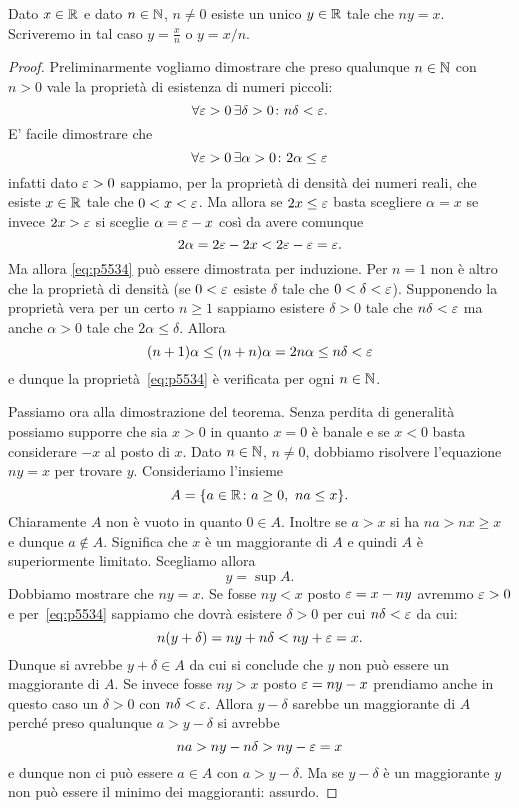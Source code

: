 \begin{theorem}
  \label{th:divisibilita}%
  Dato $x\in \mathbb R$ e dato $n\in \mathbb N$, $n\neq 0$ esiste un unico $y\in \mathbb R$ 
  tale che $n y = x$. 
  Scriveremo in tal caso $y=\frac{x}{n}$ o $y=x/n$.
\end{theorem}
\begin{proof}
  Preliminarmente vogliamo dimostrare che  
  preso qualunque $n\in \mathbb N$ con $n>0$
  vale la proprietà di esistenza di numeri piccoli:
  \begin{equation}\label{eq:p5534}
    \forall \varepsilon>0\, \exists \delta>0 \colon n\delta < \varepsilon.
  \end{equation}
  E' facile dimostrare che 
  \[
    \forall \varepsilon>0\, \exists \alpha>0 \colon 2 \alpha \le \varepsilon  
  \]
  infatti dato $\varepsilon>0$ sappiamo, per la proprietà di
  densità dei numeri reali, che esiste $x\in \mathbb R$ tale che $0<x<\varepsilon$.
  Ma allora se $2x\le \varepsilon$ basta scegliere $\alpha = x$ 
  se invece $2x>\varepsilon$ si sceglie $\alpha = \varepsilon-x$
  così da avere comunque
  \[
  2 \alpha = 2 \varepsilon - 2 x < 2\varepsilon - \varepsilon = \varepsilon.
  \]
  Ma allora \eqref{eq:p5534} può essere dimostrata per induzione.
  Per $n=1$ non è altro che la proprietà di densità (se $0<\varepsilon$ esiste $\delta$ tale 
  che $0<\delta<\varepsilon$). Supponendo la proprietà vera per un certo $n\ge 1$
  sappiamo esistere $\delta>0$ tale che $n\delta < \varepsilon$ ma anche $\alpha>0$ 
  tale che $2\alpha \le \delta$. Allora
  \[
   (n+1)\alpha \le (n+n)\alpha = 2n\alpha \le n\delta < \varepsilon
  \]
  e dunque la proprietà~\eqref{eq:p5534} è verificata per ogni $n\in \mathbb N$.

  Passiamo ora alla dimostrazione del teorema.
  Senza perdita di generalità possiamo supporre che sia $x>0$ 
  in quanto $x=0$ è banale e se $x<0$ basta considerare $-x$ al posto di $x$. 
  Dato $n\in \mathbb N$, $n\neq 0$, dobbiamo 
  risolvere l'equazione $n y = x$ per trovare $y$.
  Consideriamo l'insieme 
  \[
    A = \{a\in \mathbb R\colon a\ge 0,\ n a \le x\}.
  \]
  Chiaramente $A$ non è vuoto in quanto $0\in A$. 
  Inoltre se $a>x$ si ha $n a > n x \ge x$ e dunque $a\not \in A$.
  Significa che $x$ è un maggiorante di $A$ e quindi $A$ è superiormente limitato.
  Scegliamo allora
  \[
    y = \sup A.  
  \]
  Dobbiamo mostrare che $n y = x$. 
  Se fosse $n y < x$ posto $\varepsilon = x - n y$ avremmo $\varepsilon>0$
  e per~\eqref{eq:p5534} sappiamo che dovrà esistere $\delta>0$ 
  per cui $n\delta < \varepsilon$ da cui:
  \[
      n(y+\delta) = ny + n\delta < ny + \varepsilon = x.
  \]
  Dunque si avrebbe $y+\delta \in A$ da cui si conclude che $y$ non 
  può essere un maggiorante di $A$.
  Se invece fosse $n y > x$ posto $\varepsilon = ny - x$
  prendiamo anche in questo caso un $\delta >0$ con $n\delta < \varepsilon$.
  Allora $y-\delta$ sarebbe un maggiorante di $A$ perché preso qualunque 
  $a>y-\delta$ si avrebbe
  \[
    na > ny-n\delta > ny -\varepsilon = x
  \]
  e dunque non ci può essere $a\in A$ con $a>y-\delta$. Ma se $y-\delta$ è un 
  maggiorante $y$ non può essere il minimo dei maggioranti: assurdo.
  

\end{proof}
